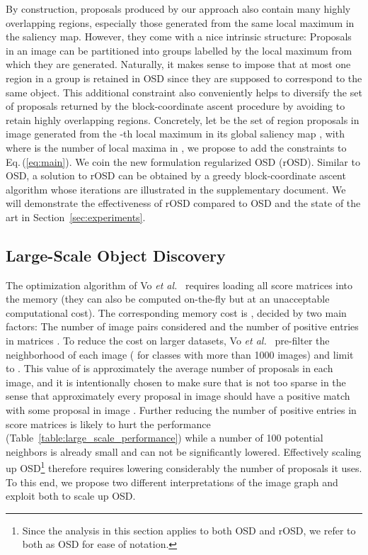 \documentclass[runningheads]{llncs}
\begin{document}
By construction, proposals produced by our approach also contain many highly overlapping regions, especially those generated from the same local maximum in the saliency map. However, they come with a nice intrinsic structure: Proposals in an image can be partitioned into groups labelled by the local maximum from which they are generated. Naturally, it makes sense to impose that at most one region in a group is retained in OSD since they are supposed to correspond to the same object. This additional constraint also conveniently helps to diversify the set of proposals returned by the block-coordinate ascent procedure by avoiding to retain highly overlapping regions. Concretely, let  be the set of region proposals in image  generated from the -th local maximum in its global saliency map , with  where  is the number of local maxima in , we propose to add the constraints  to Eq.\,(\ref{eq:main}).
We coin the new formulation regularized OSD (rOSD). Similar to OSD, a solution to rOSD can be obtained by a greedy block-coordinate ascent algorithm whose iterations are illustrated 
in the supplementary document. We will demonstrate the effectiveness of rOSD compared to OSD and the state of the art in Section~\ref{sec:experiments}.


\subsection{Large-Scale Object Discovery}
\label{sec:large_scale_osd}
The optimization algorithm of Vo {\em et al.}~\cite{Vo2019UnsupOptim} requires loading all score matrices  into the memory (they can also be computed on-the-fly but at an unacceptable computational cost). The corresponding memory cost is , decided by two main factors: The number of image pairs considered  and the number of positive entries  in matrices . To reduce the cost on larger datasets, Vo {\em et al.}~\cite{Vo2019UnsupOptim} pre-filter the neighborhood of each image ( for classes with more than 1000 images) and limit  to . This value of  is approximately the average number of proposals in each image, and it is intentionally chosen to make sure that  is not too sparse in the sense that approximately every proposal in image  should have a positive match with some proposal in image . Further reducing the number of positive entries in score matrices is likely to hurt the performance (Table~\ref{table:large_scale_performance}) while a number of 100 potential neighbors is already small and can not be significantly lowered. Effectively scaling up OSD\footnote{Since the analysis in this section applies to both OSD and rOSD, we refer to both as OSD for ease of notation.} therefore requires lowering considerably the number of proposals it uses. To this end, we propose two different interpretations of the image graph and exploit both to scale up OSD.
\end{document}
